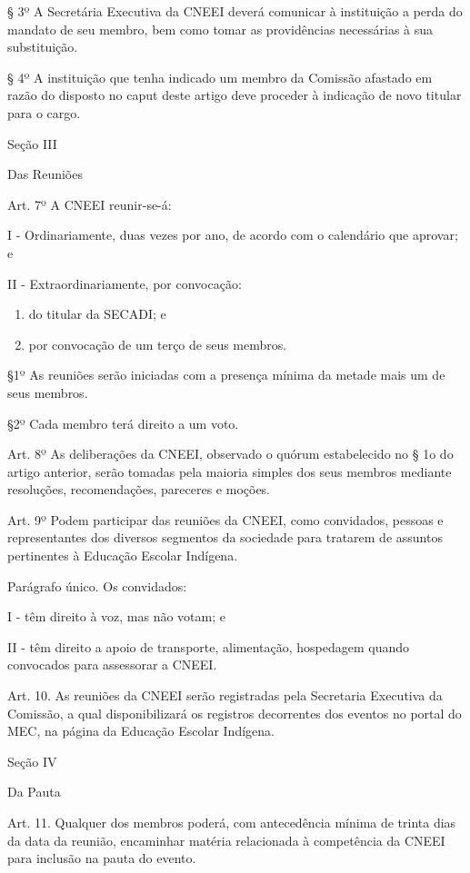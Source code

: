 \documentclass[
]{book}
\begin{document}
§ 3º A Secretária Executiva da CNEEI deverá comunicar à instituição a perda do mandato de seu membro, bem como tomar as providências necessárias à sua substituição.

§ 4º A instituição que tenha indicado um membro da Comissão afastado em razão do disposto no caput deste artigo deve proceder à indicação de novo titular para o cargo.

Seção III

Das Reuniões

Art. 7º A CNEEI reunir-se-á:

I - Ordinariamente, duas vezes por ano, de acordo com o calendário que aprovar; e

II - Extraordinariamente, por convocação:

\begin{enumerate}
\def\labelenumi{\alph{enumi})}
\item
  do titular da SECADI; e
\item
  por convocação de um terço de seus membros.
\end{enumerate}

§1º As reuniões serão iniciadas com a presença mínima da metade mais um de seus membros.

§2º Cada membro terá direito a um voto.

Art. 8º As deliberações da CNEEI, observado o quórum estabelecido no § 1o do artigo anterior, serão tomadas pela maioria simples dos seus membros mediante resoluções, recomendações, pareceres e moções.

Art. 9º Podem participar das reuniões da CNEEI, como convidados, pessoas e representantes dos diversos segmentos da sociedade para tratarem de assuntos pertinentes à Educação Escolar Indígena.

Parágrafo único. Os convidados:

I - têm direito à voz, mas não votam; e

II - têm direito a apoio de transporte, alimentação, hospedagem quando convocados para assessorar a CNEEI.

Art. 10. As reuniões da CNEEI serão registradas pela Secretaria Executiva da Comissão, a qual disponibilizará os registros decorrentes dos eventos no portal do MEC, na página da Educação Escolar Indígena.

Seção IV

Da Pauta

Art. 11. Qualquer dos membros poderá, com antecedência mínima de trinta dias da data da reunião, encaminhar matéria relacionada à competência da CNEEI para inclusão na pauta do evento.
\end{document}
